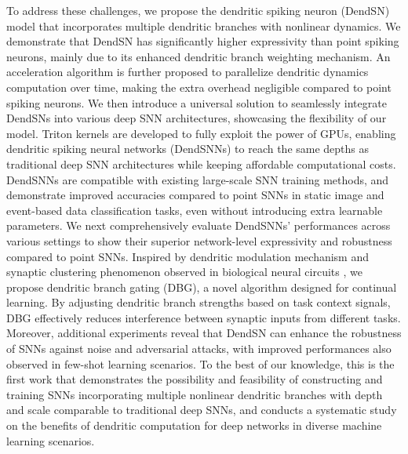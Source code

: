 To address these challenges, we propose the dendritic spiking neuron (DendSN) model that incorporates multiple dendritic branches with nonlinear dynamics. We demonstrate that DendSN has significantly higher expressivity than point spiking neurons, mainly due to its enhanced dendritic branch weighting mechanism. An acceleration algorithm is further proposed to parallelize dendritic dynamics computation over time, making the extra overhead negligible compared to point spiking neurons. We then introduce a universal solution to seamlessly integrate DendSNs into various deep SNN architectures, showcasing the flexibility of our model. Triton kernels \cite{tillet2019triton} are developed to fully exploit the power of GPUs, enabling dendritic spiking neural networks (DendSNNs) to reach the same depths as traditional deep SNN architectures while keeping affordable computational costs. DendSNNs are compatible with existing large-scale SNN training methods, and demonstrate improved accuracies compared to point SNNs in static image and event-based data classification tasks, even without introducing extra learnable parameters. We next comprehensively evaluate DendSNNs' performances across various settings to show their superior network-level expressivity and robustness compared to point SNNs. Inspired by dendritic modulation mechanism and synaptic clustering phenomenon observed in biological neural circuits \cite{wybo2023NMDA,cichon2015branch,limbacher2020cluster}, we propose dendritic branch gating (DBG), a novel algorithm designed for continual learning. By adjusting dendritic branch strengths based on task context signals, DBG effectively reduces interference between synaptic inputs from different tasks. Moreover, additional experiments reveal that DendSN can enhance the robustness of SNNs against noise and adversarial attacks, with improved performances also observed in few-shot learning scenarios. To the best of our knowledge, this is the first work that demonstrates the possibility and feasibility of constructing and training SNNs incorporating multiple nonlinear dendritic branches with depth and scale comparable to traditional deep SNNs, and conducts a systematic study on the benefits of dendritic computation for deep networks in diverse machine learning scenarios. 
